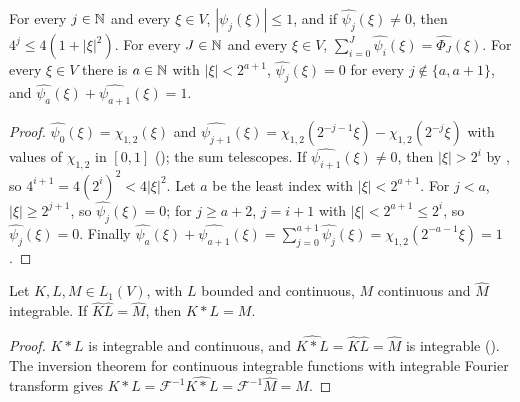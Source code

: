 \begin{lemma}
\label{lem:fourier-psi-window}
\leanok
{}
For every $j \in \mathbb{N}$ and every $\xi \in V$, $|\widehat{\psi_j}(\xi)| \leq 1$, and if
$\widehat{\psi_j}(\xi) \neq 0$, then $4^j \leq 4(1 + |\xi|^2)$. For every $J \in \mathbb{N}$ and every
$\xi \in V$, $\sum_{i=0}^J \widehat{\psi_i}(\xi) = \widehat{\Phi_J}(\xi)$. For every $\xi \in V$
there is $a \in \mathbb{N}$ with $|\xi| < 2^{a+1}$,
$\widehat{\psi_j}(\xi) = 0$ for every $j \notin \{a, a+1\}$, and
$\widehat{\psi_a}(\xi) + \widehat{\psi_{a+1}}(\xi) = 1$.
\end{lemma}

\begin{proof}
\leanok
$\widehat{\psi_0}(\xi) = \chi_{1,2}(\xi)$ and
$\widehat{\psi_{j+1}}(\xi) = \chi_{1,2}(2^{-j-1}\xi) - \chi_{1,2}(2^{-j}\xi)$ with values of
$\chi_{1,2}$ in $[0, 1]$ (); the sum telescopes. If
$\widehat{\psi_{i+1}}(\xi) \neq 0$, then $|\xi| > 2^i$ by , so
$4^{i+1} = 4 (2^i)^2 < 4 |\xi|^2$. Let $a$ be the least index with $|\xi| < 2^{a+1}$. For $j < a$,
$|\xi| \geq 2^{j+1}$, so $\widehat{\psi_j}(\xi) = 0$; for $j \geq a + 2$, $j = i + 1$ with
$|\xi| < 2^{a+1} \leq 2^i$, so $\widehat{\psi_j}(\xi) = 0$. Finally
$\widehat{\psi_a}(\xi) + \widehat{\psi_{a+1}}(\xi) = \sum_{j=0}^{a+1} \widehat{\psi_j}(\xi)
= \chi_{1,2}(2^{-a-1}\xi) = 1$.
\end{proof}

\begin{lemma}
\label{lem:conv-of-fourier}
\leanok
{}
Let $K, L, M \in L_1(V)$, with $L$ bounded and continuous, $M$ continuous and $\widehat M$
integrable. If $\widehat K \widehat L = \widehat M$, then $K * L = M$.
\end{lemma}

\begin{proof}
\leanok
$K * L$ is integrable and continuous, and $\widehat{K * L} = \widehat K \widehat L = \widehat M$ is
integrable (). The inversion theorem for continuous integrable functions
with integrable Fourier transform gives
$K * L = \mathcal F^{-1} \widehat{K * L} = \mathcal F^{-1} \widehat M = M$.
\end{proof}

